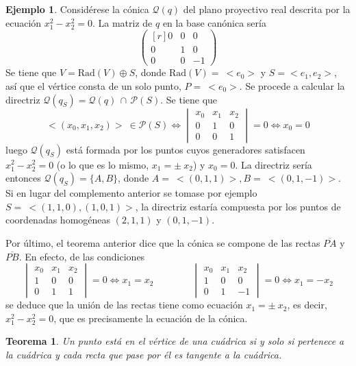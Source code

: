 \documentclass[12pt]{report}
\newtheorem{theorem}{Teorema}[chapter]
\theoremstyle{definition}
\theoremstyle{definition}
\newtheorem{example}{Ejemplo}[chapter]
\theoremstyle{remark}
\begin{document}
\begin{example}
Considérese la cónica $\mathcal{Q}(q)$ del plano proyectivo real descrita por la ecuación $x_1^2-x_2^2 = 0$. La matriz de $q$ en la base canónica sería
\[
\begin{pmatrix*}[r]
    0 & 0 & 0 \\
    0 & 1 & 0 \\
    0 & 0 & -1
\end{pmatrix*}
\]
Se tiene que $V = \textrm{Rad}(V) \oplus S$, donde $\textrm{Rad}(V) = \ < e_0 >$ y $S = <e_1, e_2>$, así que el vértice consta de un solo punto, $P = \ <e_0>$. Se procede a calcular la directriz $\mathcal{Q}(q_S) = \mathcal{Q}(q) \, \cap \, \mathcal{P}(S)$. Se tiene que
\[<(x_0,x_1,x_2)> \ \in \mathcal{P}(S) \iff \begin{vmatrix*}
    x_0 & x_1 & x_2 \\
    0 & 1 & 0 \\
    0 & 0 & 1
\end{vmatrix*} = 0 \iff x_0 = 0\]
luego $\mathcal{Q}(q_S)$ está formada por los puntos cuyos generadores satisfacen $x_1^2-x_2^2 = 0$ (o lo que es lo mismo, $x_1 = \pm \ x_2$) y $x_0 = 0$. La directriz sería entonces $\mathcal{Q}(q_S) = \{A,B\}$, donde $A = \ <(0,1,1)>, B = \ <(0,1,-1)>$. Si en lugar del complemento anterior se tomase por ejemplo $S = \ <(1,1,0),(1,0,1)>$, la directriz estaría compuesta por los puntos de coordenadas homogéneas $(2,1,1)$ y $(0,1,-1)$. 

\vspace{2mm}
\noindent Por último, el teorema anterior dice que la cónica se compone de las rectas $\overline{PA}$ y $\overline{PB}$. En efecto, de las condiciones
\[\begin{vmatrix*}
        x_0 & x_1 & x_2 \\
        1 & 0 & 0 \\
        0 & 1 & 1
    \end{vmatrix*} = 0 \iff x_1 = x_2 \qquad \qquad
\begin{vmatrix*}
        x_0 & x_1 & x_2 \\
        1 & 0 & 0 \\
        0 & 1 & -1
    \end{vmatrix*} = 0 \iff x_1 = -x_2\]
se deduce que la unión de las rectas tiene como ecuación $x_1 = \pm \ x_2$, es decir, $x_1^2 - x_2^2 = 0$, que es precisamente la ecuación de la cónica.
\end{example}

\begin{theorem}
\label{teo5.3.}
Un punto está en el vértice de una cuádrica si y solo si pertenece a la cuádrica y cada recta que pase por él es tangente a la cuádrica.
\end{theorem}
\end{document}
